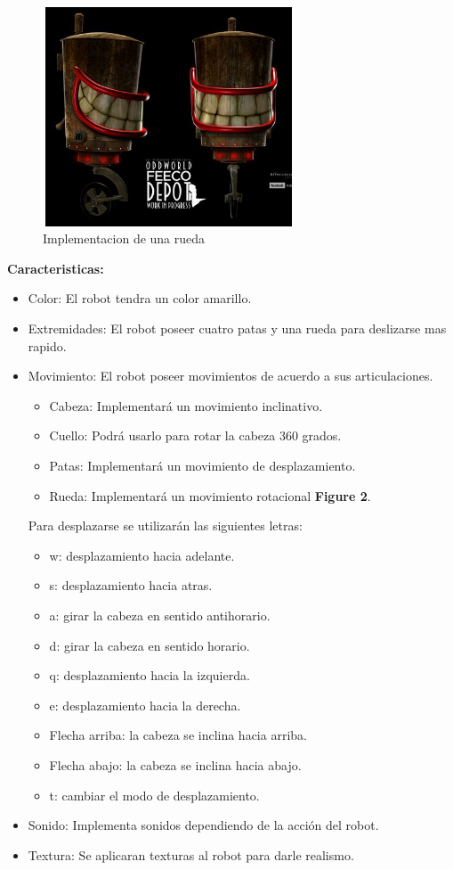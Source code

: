 \documentclass[a4paper]{article}
\begin{document}
\begin{figure}
	\centering
	\includegraphics[width=7.5cm,height=6.5cm]{KeplinRueda.JPG}
	\caption{Implementacion de una rueda}
	\label{FI1_2}
\end{figure}

\textbf{Caracteristicas:}

\begin{itemize}
\item Color: El robot tendra un color amarillo.
\item Extremidades: El robot poseer cuatro patas y una rueda para deslizarse mas rapido.
\item Movimiento: El robot poseer movimientos de acuerdo a sus articulaciones.
	\begin{itemize}
		\item Cabeza: Implementará un movimiento inclinativo.
		\item Cuello: Podrá usarlo para rotar la cabeza 360 grados.
		\item Patas: Implementará un movimiento de desplazamiento.
		\item Rueda: Implementará un movimiento rotacional \textbf{Figure 2}.
		
	\end{itemize}
	Para desplazarse se utilizarán las siguientes letras:
		\begin{itemize}
			\item w: desplazamiento hacia adelante.
			\item s: desplazamiento hacia atras.
			\item a: girar la cabeza en sentido antihorario.
			\item d: girar la cabeza en sentido horario.
			\item q: desplazamiento hacia la izquierda.
			\item e: desplazamiento hacia la derecha.
			\item Flecha arriba: la cabeza se inclina hacia arriba. 
			\item Flecha abajo: la cabeza se inclina hacia abajo.
			\item t: cambiar el modo de desplazamiento.
			
		\end{itemize}
\item Sonido: Implementa sonidos dependiendo de la acción del robot.
\item Textura: Se aplicaran texturas al robot para darle realismo.

\end{itemize}
\end{document}
